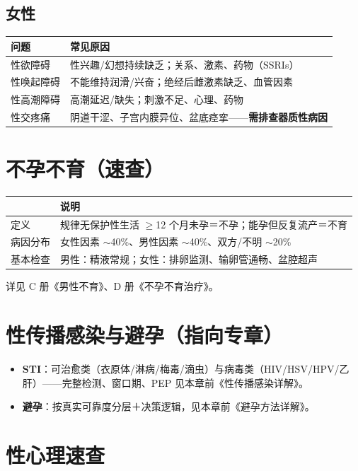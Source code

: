\documentclass[12pt,UTF8,openany]{ctexbook}
\begin{document}
\subsection*{女性}

\begin{tabularx}{\textwidth}{lX}
\toprule
问题 & 常见原因 \\
\midrule
性欲障碍 & 性兴趣/幻想持续缺乏；关系、激素、药物（SSRIs） \\
性唤起障碍 & 不能维持润滑/兴奋；绝经后雌激素缺乏、血管因素 \\
性高潮障碍 & 高潮延迟/缺失；刺激不足、心理、药物 \\
性交疼痛 & 阴道干涩、子宫内膜异位、盆底痉挛——\textbf{需排查器质性病因} \\
\bottomrule
\end{tabularx}

\section{不孕不育（速查）}

\begin{tabularx}{\textwidth}{lX}
\toprule
& 说明 \\
\midrule
定义 & 规律无保护性生活 $\ge$12 个月未孕＝不孕；能孕但反复流产＝不育 \\
病因分布 & 女性因素 $\sim$40\%、男性因素 $\sim$40\%、双方/不明 $\sim$20\% \\
基本检查 & 男性：精液常规；女性：排卵监测、输卵管通畅、盆腔超声 \\
\bottomrule
\end{tabularx}

\noindent 详见 C 册《男性不育》、D 册《不孕不育治疗》。

\section{性传播感染与避孕（指向专章）}

\begin{itemize}[leftmargin=2em,itemsep=0.3em]
  \item \textbf{STI}：可治愈类（衣原体/淋病/梅毒/滴虫）与病毒类（HIV/HSV/HPV/乙肝）——完整检测、窗口期、PEP 见本章前《性传播感染详解》。
  \item \textbf{避孕}：按真实可靠度分层＋决策逻辑，见本章前《避孕方法详解》。
\end{itemize}

\section{性心理速查}
\end{document}
